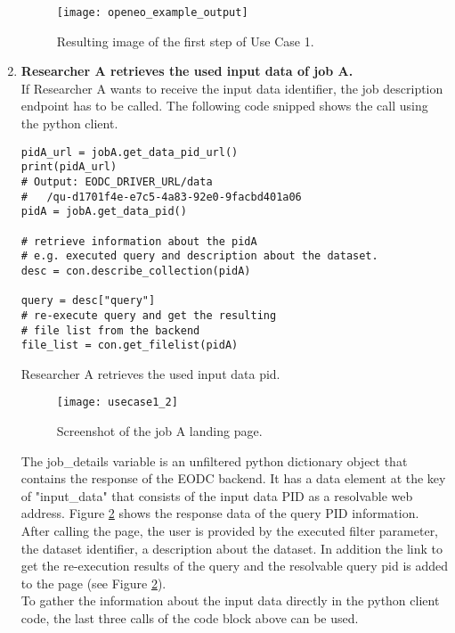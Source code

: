 \documentclass[draft,final]{vutinfth} %
\newenvironment{code}{\captionsetup{type=listing}}{}
\begin{document}
\begin{enumerate}
\begin{figure}[h]
	\centering
	\texttt{[image: openeo\_example\_output]}
	\caption{Resulting image of the first step of Use Case 1.}
	\label{fig:impl_usecase1_min} %
\end{figure}

	\item \textbf{Researcher A retrieves the used input data of job A.} \\
	If Researcher A wants to receive the input data identifier, the job description endpoint has to be called. The following code snipped shows the call using the python client.

\begin{code}
	\begin{verbatim}
pidA_url = jobA.get_data_pid_url()
print(pidA_url)
# Output: EODC_DRIVER_URL/data
#	/qu-d1701f4e-e7c5-4a83-92e0-9facbd401a06
pidA = jobA.get_data_pid()

# retrieve information about the pidA 
# e.g. executed query and description about the dataset.
desc = con.describe_collection(pidA)

query = desc["query"]
# re-execute query and get the resulting 
# file list from the backend
file_list = con.get_filelist(pidA)
	\end{verbatim}
	\caption{Researcher A retrieves the used input data pid.}
	\label{lst:impl_usecase1_2}
\end{code}
	
	\begin{figure}[h]
		\centering
		\texttt{[image: usecase1\_2]}
		\caption{Screenshot of the job A landing page.}
		\label{fig:usecase1-pid} %
	\end{figure}
	
	The job\_details variable is an unfiltered python dictionary object that contains the response of the EODC backend. It has a data element at the key of "input\_data" that consists of the input data PID as a resolvable web address. Figure \ref{fig:usecase1-pid} shows the response data of the query PID information. After calling the page, the user is provided by the executed filter parameter, the dataset identifier, a description about the dataset. In addition the link to get the re-execution results of the query and the resolvable query pid is added to the page (see Figure \ref{fig:usecase1-pid}). \\
	To gather the information about the input data directly in the python client code, the last three calls of the code block above can be used.  
	

\end{enumerate}
\end{document}
